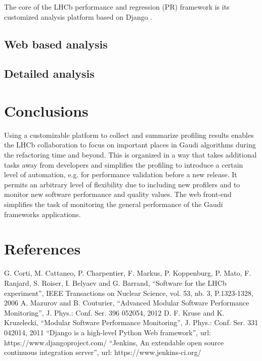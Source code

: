 \documentclass[a4paper]{jpconf}
\begin{document}
The core of the LHCb performance and regression (PR) framework is its customized analysis platform based on Django \cite{django}.

\subsection{Web based analysis}
\label{sec:web_based_analysis}

\subsection{Detailed analysis}
\label{sec:detailed_analysis}

\section{Conclusions}
\label{sec:conclusions}

Using a customizable platform to collect and summarize profiling results enables the LHCb collaboration to focus on important places in Gaudi algorithms during the refactoring time and beyond. This is organized in a way that takes additional tasks away from developers and simplifies the profiling to introduce a certain level of automation, e.g. for performance validation before a new release. It permits an arbitrary level of flexibility due to including new profilers and to monitor new software performance and quality values. The web front-end simplifies the task of monitoring the general performance of the Gaudi frameworks applications. 

\section*{References}
\begin{thebibliography}{3}
 G. Corti, M. Cattaneo, P. Charpentier, F. Markus, P. Koppenburg, P. Mato, F. Ranjard, S. Roiser, I. Belyaev and G. Barrand, ``Software for the LHCb experiment'', IEEE Transactions on Nuclear Science, vol. 53, nb. 3, P.1323-1328, 2006
 A. Mazurov and B. Couturier, ``Advanced Modular Software Performance Monitoring'', J. Phys.: Conf. Ser. 396 052054, 2012
 D. F. Kruse and K. Kruzelecki, ``Modular Software Performance Monitoring'', J. Phys.: Conf. Ser. 331 042014, 2011
 ``Django is a high-level Python Web framework'', url: https://www.djangoproject.com/
 ``Jenkins, An extendable open source continuous integration server'', url: https://www.jenkins-ci.org/
\end{thebibliography}
\end{document}
